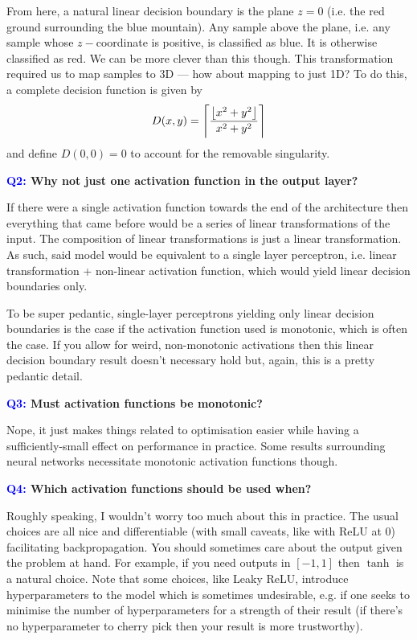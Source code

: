\documentclass[11pt]{article}
\begin{document}
From here, a natural linear decision boundary is the plane $z=0$ (i.e. the red ground surrounding the blue mountain). Any sample above the plane, i.e. any sample whose $z-$coordinate is positive, is classified as blue. It is otherwise classified as red. We can be more clever than this though. This transformation required us to map samples to 3D — how about mapping to just 1D? To do this, a complete decision function is given by
$$
D(x,y)=\left\lceil\frac{\left\lfloor x^2+y^2\right\rfloor}{x^2+y^2}\right\rceil
$$
and define $D(0,0)=0$ to account for the removable singularity.

\begin{center}
    \textbf{\textcolor{blue}{Q2:} Why not just one activation function in the output layer?}
\end{center}
If there were a single activation function towards the end of the architecture then everything that came before would be a series of linear transformations of the input. The composition of linear transformations is just a linear transformation. As such, said model would be equivalent to a single layer perceptron, i.e. linear transformation + non-linear activation function, which would yield linear decision boundaries only.

To be super pedantic, single-layer perceptrons yielding only linear decision boundaries is the case if the activation function used is monotonic, which is often the case. If you allow for weird, non-monotonic activations then this linear decision boundary result doesn't necessary hold but, again, this is a pretty pedantic detail.

\begin{center}
    \textbf{\textcolor{blue}{Q3:} Must activation functions be monotonic?}
\end{center}
Nope, it just makes things related to optimisation easier while having a sufficiently-small effect on performance in practice. Some results surrounding neural networks necessitate monotonic activation functions though.

\begin{center}
    \textbf{\textcolor{blue}{Q4:} Which activation functions should be used when?}
\end{center}
Roughly speaking, I wouldn't worry too much about this in practice. The usual choices are all nice and differentiable (with small caveats, like with ReLU at 0) facilitating backpropagation. You should sometimes care about the output given the problem at hand. For example, if you need outputs in $[-1,1]$ then $\tanh$ is a natural choice. Note that some choices, like Leaky ReLU, introduce hyperparameters to the model which is sometimes undesirable, e.g. if one seeks to minimise the number of hyperparameters for a strength of their result (if there's no hyperparameter to cherry pick then your result is more trustworthy).
\end{document}
